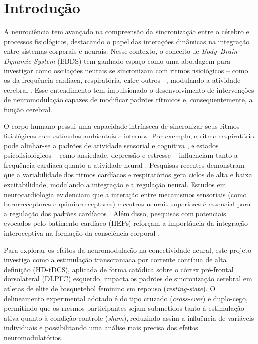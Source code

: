\chapter{Introdução}
\label{chap:introducao}
A neurociência tem avançado na compreensão da sincronização entre o cérebro e processos fisiológicos, destacando o papel das interações dinâmicas na integração entre sistemas corporais e neurais. Nesse contexto, o conceito de \textit{Body--Brain Dynamic System} (BBDS) tem ganhado espaço como uma abordagem para investigar como oscilações neurais se sincronizam com ritmos fisiológicos – como os da frequência cardíaca, respiratória, entre outros –, modulando a atividade cerebral \cite{cohen2017where,criscuolo2022cognition}. Esse entendimento tem impulsionado o desenvolvimento de intervenções de neuromodulação capazes de modificar padrões rítmicos e, consequentemente, a função cerebral.

O corpo humano possui uma capacidade intrínseca de sincronizar seus ritmos fisiológicos com estímulos ambientais e internos. Por exemplo, o ritmo respiratório pode alinhar-se a padrões de atividade sensorial e cognitiva \cite{haas1985effects}, e estados psicofisiológicos – como ansiedade, depressão e estresse – influenciam tanto a frequência cardíaca quanto a atividade neural \cite{criscuolo2022cognition}. Pesquisas recentes demonstram que a variabilidade dos ritmos cardíacos e respiratórios gera ciclos de alta e baixa excitabilidade, modulando a integração e a regulação neural. Estudos em neurocardiologia evidenciam que a interação entre mecanismos sensoriais (como barorreceptores e quimiorreceptores) e centros neurais superiores é essencial para a regulação dos padrões cardíacos \cite{marcondes2024linguagem}. Além disso, pesquisas com potenciais evocados pelo batimento cardíaco (HEPs) reforçam a importância da integração interoceptiva na formação da consciência corporal \cite{banelli2020skipping, mackinnon2013utilizing, park2018neural}.

Para explorar os efeitos da neuromodulação na conectividade neural, este projeto investiga como a estimulação transcraniana por corrente contínua de alta definição (HD-tDCS), aplicada de forma catódica sobre o córtex pré-frontal dorsolateral (DLPFC) esquerdo, impacta os padrões de sincronização cerebral em atletas de elite de basquetebol feminino em repouso (\textit{resting-state}). O delineamento experimental adotado é do tipo cruzado (\textit{cross-over}) e duplo-cego, permitindo que os mesmos participantes sejam submetidos tanto à estimulação ativa quanto à condição controle (\textit{sham}), reduzindo assim a influência de variáveis individuais e possibilitando uma análise mais precisa dos efeitos neuromodulatórios.

